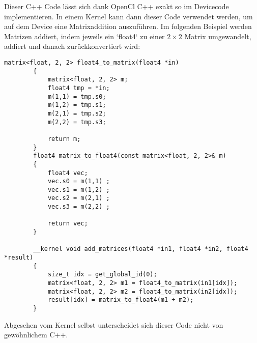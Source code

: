 		Dieser C++ Code lässt sich dank OpenCl C++ exakt so im Devicecode implementieren. In einem \Gls{Kernel} kann dann dieser Code verwendet werden, um auf dem Device eine Matrixaddition auszuführen. Im folgenden Beispiel werden Matrizen addiert, indem jeweils ein \li`float4` zu einer $2\times 2$ Matrix umgewandelt, addiert und danach zurückkonvertiert wird:	
		\begin{lstlisting}[caption=~OpenCl C++ Kernel]
		matrix<float, 2, 2> float4_to_matrix(float4 *in) 
		{
			matrix<float, 2, 2> m;
			float4 tmp = *in;
			m(1,1) = tmp.s0;
			m(1,2) = tmp.s1;
			m(2,1) = tmp.s2;
			m(2,2) = tmp.s3;
			
			return m;
		}
		float4 matrix_to_float4(const matrix<float, 2, 2>& m)
		{
			float4 vec;
			vec.s0 = m(1,1) ;
			vec.s1 = m(1,2) ;
			vec.s2 = m(2,1) ;
			vec.s3 = m(2,2) ;

			return vec;
		}

		__kernel void add_matrices(float4 *in1, float4 *in2, float4 *result) 
		{
			size_t idx = get_global_id(0);
			matrix<float, 2, 2> m1 = float4_to_matrix(in1[idx]);
			matrix<float, 2, 2> m2 = float4_to_matrix(in2[idx]);
			result[idx] = matrix_to_float4(m1 + m2);
		}
		\end{lstlisting}
		
		Abgesehen vom \Gls{Kernel} selbst unterscheidet sich dieser Code nicht von gewöhnlichem C++.
